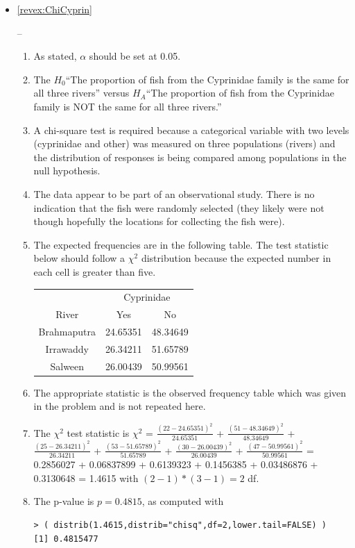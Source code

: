 \documentclass[10pt,openany]{book}\usepackage[]{graphicx}\usepackage[]{color}
\makeatletter
\newenvironment{kframe}{%
 \def\at@end@of@kframe{}%
 \ifinner\ifhmode%
  \def\at@end@of@kframe{\end{minipage}}%
  \begin{minipage}{\columnwidth}%
 \fi\fi%
 \def\FrameCommand##1{\hskip\@totalleftmargin \hskip-\fboxsep
 \colorbox{shadecolor}{##1}\hskip-\fboxsep
     \hskip-\linewidth \hskip-\@totalleftmargin \hskip\columnwidth}%
 \MakeFramed {\advance\hsize-\width
   \@totalleftmargin\z@ \linewidth\hsize
   \@setminipage}}%
 {\par\unskip\endMakeFramed%
 \at@end@of@kframe}
\newenvironment{knitrout}{}{} %
\makeatother
\begin{document}
\begin{itemize}
  \item \hypertarget{ans:ChiCyprin}{\ref{revex:ChiCyprin}} --
    \begin{enumerate}
      \item As stated, $\alpha$ should be set at 0.05.
      \item The $H_{0}$``The proportion of fish from the Cyprinidae family is the same for all three rivers'' versus $H_{A}$``The proportion of fish from the Cyprinidae family is NOT the same for all three rivers.''
      \item A chi-square test is required because a categorical variable with two levels (cyprinidae and other) was measured on three populations (rivers) and the distribution of responses is being compared among populations in the null hypothesis.
      \item The data appear to be part of an observational study.  There is no indication that the fish were randomly selected (they likely were not though hopefully the locations for collecting the fish were).
      \item The expected frequencies are in the following table.  The test statistic below should follow a $\chi^{2}$ distribution because the expected number in each cell is greater than five.
        \begin{center}
          \begin{tabular}{|c|c|c|}
            \multicolumn{1}{c}{} & \multicolumn{2}{c}{Cyprinidae} \\
            \cline{2-3}
            \multicolumn{1}{c|}{River} & Yes & No \\
            \hline
            Brahmaputra & 24.65351 & 48.34649 \\
            \hline
            Irrawaddy & 26.34211 & 51.65789 \\
            \hline
            Salween & 26.00439 & 50.99561 \\
            \hline
          \end{tabular}
        \end{center}
      \item The appropriate statistic is the observed frequency table which was given in the problem and is not repeated here.
      \item The $\chi^{2}$ test statistic is $\chi^{2}$ = $\frac{(22-24.65351)^{2}}{24.65351}$ + $\frac{(51-48.34649)^{2}}{48.34649}$ + $\frac{(25-26.34211)^{2}}{26.34211}$ + $\frac{(53-51.65789)^{2}}{51.65789}$ + $\frac{(30-26.00439)^{2}}{26.00439}$ + $\frac{(47-50.99561)^{2}}{50.99561}$ = 0.2856027 + 0.06837899 + 0.6139323 + 0.1456385 + 0.03486876 + 0.3130648 = 1.4615 with $(2-1)*(3-1)=2$ df.
      \item The p-value is $p=0.4815$, as computed with
\begin{knitrout}
\color{fgcolor}\begin{kframe}
\begin{verbatim}
> ( distrib(1.4615,distrib="chisq",df=2,lower.tail=FALSE) )
[1] 0.4815477
\end{verbatim}
\end{kframe}


\end{knitrout}
\end{enumerate}
\end{itemize}
\end{document}
